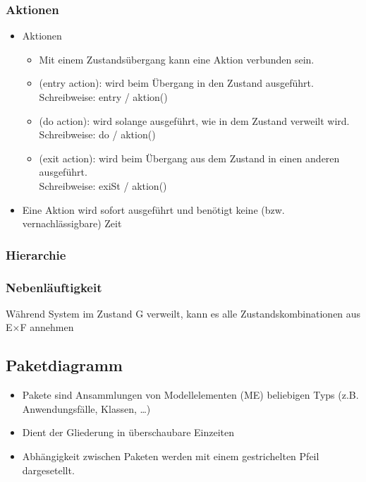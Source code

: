 \subsubsection{Aktionen}
\begin{itemize}
    \item Aktionen
    \begin{itemize}
        \item Mit einem Zustandsübergang kann eine Aktion verbunden sein.
        \item {} (entry action): wird beim Übergang in den Zustand ausgeführt. \\
        Schreibweise: entry / aktion()
        \item {}(do action): wird solange ausgeführt, wie in dem Zustand verweilt wird. \\
        Schreibweise: do / aktion()
        \item {}(exit action): wird beim Übergang aus dem Zustand in einen anderen ausgeführt. \\
        Schreibweise: exiSt / aktion()
    \end{itemize}
    \item Eine Aktion wird sofort ausgeführt und benötigt keine (bzw. vernachlässigbare) Zeit
\end{itemize}

\subsubsection{Hierarchie}

\subsubsection{Nebenläuftigkeit}
Während System im Zustand G verweilt, kann es alle Zustandskombinationen aus E×F annehmen

\subsection{Paketdiagramm}
\begin{itemize}
    \item Pakete sind Ansammlungen von Modellelementen (ME) beliebigen Typs (z.B. Anwendungsfälle, Klassen, …)
    \item Dient der Gliederung in überschaubare Einzeiten
    \item Abhängigkeit zwischen Paketen werden mit einem gestrichelten Pfeil dargesetellt.
\end{itemize}

